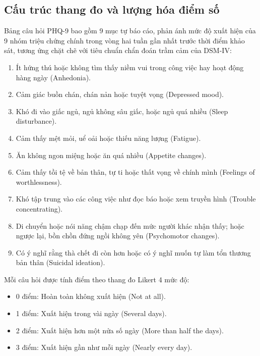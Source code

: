 \subsection{Cấu trúc thang đo và lượng hóa điểm số}
Bảng câu hỏi PHQ-9 bao gồm 9 mục tự báo cáo, phản ánh mức độ xuất hiện của 9 nhóm triệu chứng chính trong vòng hai tuần gần nhất trước thời điểm khảo sát, tương ứng chặt chẽ với tiêu chuẩn chẩn đoán trầm cảm của DSM-IV:
\begin{enumerate}
    \item Ít hứng thú hoặc không tìm thấy niềm vui trong công việc hay hoạt động hàng ngày (Anhedonia).
    \item Cảm giác buồn chán, chán nản hoặc tuyệt vọng (Depressed mood).
    \item Khó đi vào giấc ngủ, ngủ không sâu giấc, hoặc ngủ quá nhiều (Sleep disturbance).
    \item Cảm thấy mệt mỏi, uể oải hoặc thiếu năng lượng (Fatigue).
    \item Ăn không ngon miệng hoặc ăn quá nhiều (Appetite changes).
    \item Cảm thấy tồi tệ về bản thân, tự ti hoặc thất vọng về chính mình (Feelings of worthlessness).
    \item Khó tập trung vào các công việc như đọc báo hoặc xem truyền hình (Trouble concentrating).
    \item Di chuyển hoặc nói năng chậm chạp đến mức người khác nhận thấy; hoặc ngược lại, bồn chồn đứng ngồi không yên (Psychomotor changes).
    \item Có ý nghĩ rằng thà chết đi còn hơn hoặc có ý nghĩ muốn tự làm tổn thương bản thân (Suicidal ideation).
\end{enumerate}

Mỗi câu hỏi được tính điểm theo thang đo Likert 4 mức độ:
\begin{itemize}
    \item 0 điểm: Hoàn toàn không xuất hiện (Not at all).
    \item 1 điểm: Xuất hiện trong vài ngày (Several days).
    \item 2 điểm: Xuất hiện hơn một nửa số ngày (More than half the days).
    \item 3 điểm: Xuất hiện gần như mỗi ngày (Nearly every day).
\end{itemize}


